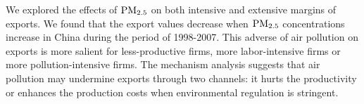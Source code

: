 \documentclass[12pt]{article}
\begin{document}
 We explored the effects of $\rm PM_{2.5}$ on both intensive and extensive margins of
  exports. We found that the export values decrease when $\rm PM_{2.5}$ concentrations increase in China during the period of 1998-2007. This adverse of air pollution on exports is more salient for less-productive firms, more labor-intensive firms or more pollution-intensive firms. The mechanism analysis suggests that air pollution may undermine exports through two channels: it hurts the productivity or enhances the production costs when environmental regulation is stringent. 
  
  

\newpage
\small



\newpage
\end{document}
